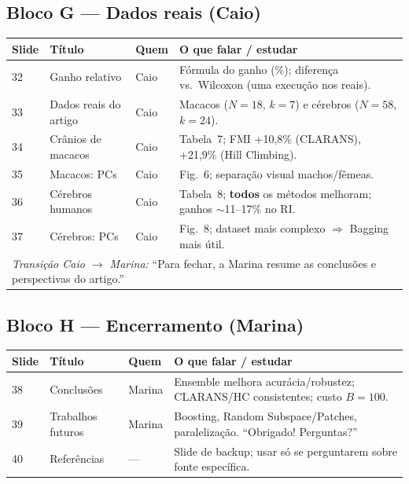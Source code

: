 \documentclass[12pt,a4paper]{article}
\begin{document}
\subsection{Bloco G --- Dados reais (Caio)}

\begin{longtable}{@{}p{1.2cm}p{5.5cm}p{2.2cm}p{5.8cm}@{}}
\toprule
\textbf{Slide} & \textbf{Título} & \textbf{Quem} & \textbf{O que falar / estudar} \\
\midrule
\endhead
32 & Ganho relativo & Caio & Fórmula do ganho (\%); diferença vs.\ Wilcoxon (uma execução nos reais). \\
33 & Dados reais do artigo & Caio & Macacos ($N=18$, $k=7$) e cérebros ($N=58$, $k=24$). \\
34 & Crânios de macacos & Caio & Tabela~7; FMI +10,8\% (CLARANS), +21,9\% (Hill Climbing). \\
35 & Macacos: PCs & Caio & Fig.\ 6; separação visual machos/fêmeas. \\
36 & Cérebros humanos & Caio & Tabela~8; \textbf{todos} os métodos melhoram; ganhos $\sim$11--17\% no RI. \\
37 & Cérebros: PCs & Caio & Fig.\ 8; dataset mais complexo $\Rightarrow$ Bagging mais útil. \\
\midrule
\multicolumn{4}{l}{\textit{Transição Caio $\rightarrow$ Marina:} ``Para fechar, a Marina resume as conclusões e perspectivas do artigo.''} \\
\bottomrule
\end{longtable}

\subsection{Bloco H --- Encerramento (Marina)}

\begin{longtable}{@{}p{1.2cm}p{5.5cm}p{2.2cm}p{5.8cm}@{}}
\toprule
\textbf{Slide} & \textbf{Título} & \textbf{Quem} & \textbf{O que falar / estudar} \\
\midrule
\endhead
38 & Conclusões & Marina & Ensemble melhora acurácia/robustez; CLARANS/HC consistentes; custo $B=100$. \\
39 & Trabalhos futuros & Marina & Boosting, Random Subspace/Patches, paralelização. ``Obrigado! Perguntas?'' \\
40 & Referências & --- & Slide de backup; usar só se perguntarem sobre fonte específica. \\
\bottomrule
\end{longtable}
\end{document}
